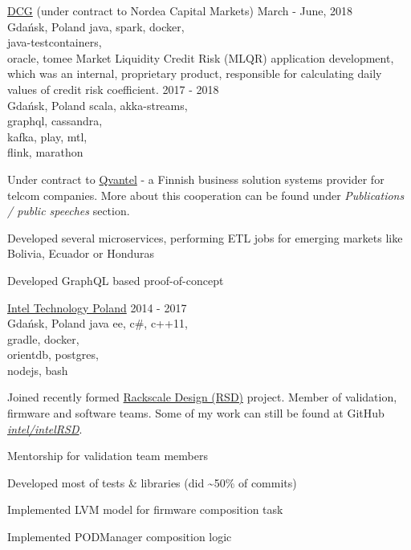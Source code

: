       {\href{https://diversecg.pl/}{DCG} (under contract to Nordea Capital Markets)}
      {March - June, 2018\\Gdańsk, Poland}
      {java, spark, docker,\\java-testcontainers,\\oracle, tomee}
      {Market Liquidity Credit Risk (MLQR) application development, which was an internal,
        proprietary product, responsible for calculating daily values of credit risk
        coefficient.
      }      
      {2017 - 2018\\Gdańsk, Poland}
      {scala, akka-streams,\\graphql, cassandra,\\kafka, play, mtl,\\flink, marathon}
      {Under contract to \href{https://www.qvantel.com}{Qvantel} - a Finnish business solution
        systems provider for telcom companies. More about this cooperation can be found under
        \emph{Publications / public speeches} section.
        \begin{missions}
        \item Developed several microservices, performing ETL jobs for emerging markets like Bolivia, Ecuador or Honduras
        \item Developed GraphQL based proof-of-concept
        \end{missions}
      }
      {\href{https://www.intel.com/content/www/us/en/jobs/locations/poland.html}{Intel Technology Poland}}
      {2014 - 2017\\Gdańsk, Poland}
      {java ee, c\#, c++11,\\gradle, docker,\\orientdb, postgres,\\nodejs, bash}
      {
        Joined recently formed \href{https://www.intel.com/content/dam/www/public/us/en/documents/white-papers/rack-scale-design-architecture-white-paper.pdf}{Rackscale Design (RSD)} project. Member of validation,
        firmware and software teams. Some of my work can still be found at GitHub \emph{\href{https://github.com/intel/intelRSD}{intel/intelRSD}}.
        \begin{missions}
        \item Mentorship for validation team members
        \item Developed most of tests \& libraries (did \textasciitilde50\% of commits)
        \item Implemented LVM model for firmware composition task
        \item Implemented PODManager composition logic
        \end{missions}
      }
